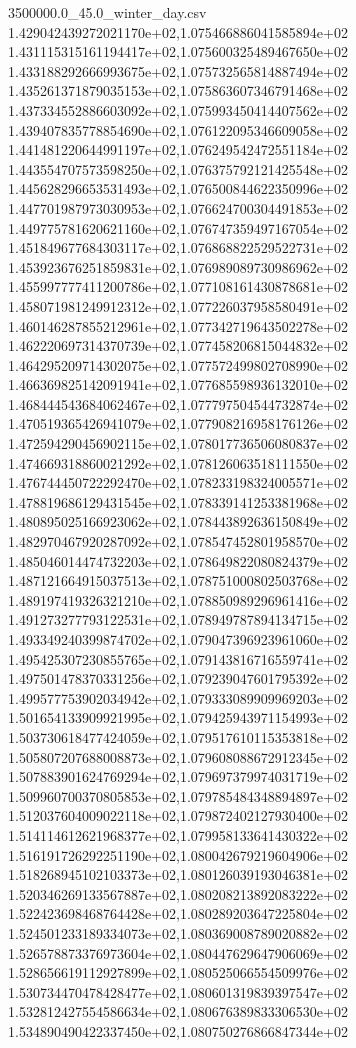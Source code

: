 \begin{filecontents*}{3500000.0_45.0_winter_day.csv}
1.429042439272021170e+02,1.075466886041585894e+02
1.431115315161194417e+02,1.075600325489467650e+02
1.433188292666993675e+02,1.075732565814887494e+02
1.435261371879035153e+02,1.075863607346791468e+02
1.437334552886603092e+02,1.075993450414407562e+02
1.439407835778854690e+02,1.076122095346609058e+02
1.441481220644991197e+02,1.076249542472551184e+02
1.443554707573598250e+02,1.076375792121425548e+02
1.445628296653531493e+02,1.076500844622350996e+02
1.447701987973030953e+02,1.076624700304491853e+02
1.449775781620621160e+02,1.076747359497167054e+02
1.451849677684303117e+02,1.076868822529522731e+02
1.453923676251859831e+02,1.076989089730986962e+02
1.455997777411200786e+02,1.077108161430878681e+02
1.458071981249912312e+02,1.077226037958580491e+02
1.460146287855212961e+02,1.077342719643502278e+02
1.462220697314370739e+02,1.077458206815044832e+02
1.464295209714302075e+02,1.077572499802708990e+02
1.466369825142091941e+02,1.077685598936132010e+02
1.468444543684062467e+02,1.077797504544732874e+02
1.470519365426941079e+02,1.077908216958176126e+02
1.472594290456902115e+02,1.078017736506080837e+02
1.474669318860021292e+02,1.078126063518111550e+02
1.476744450722292470e+02,1.078233198324005571e+02
1.478819686129431545e+02,1.078339141253381968e+02
1.480895025166923062e+02,1.078443892636150849e+02
1.482970467920287092e+02,1.078547452801958570e+02
1.485046014474732203e+02,1.078649822080824379e+02
1.487121664915037513e+02,1.078751000802503768e+02
1.489197419326321210e+02,1.078850989296961416e+02
1.491273277793122531e+02,1.078949787894134715e+02
1.493349240399874702e+02,1.079047396923961060e+02
1.495425307230855765e+02,1.079143816716559741e+02
1.497501478370331256e+02,1.079239047601795392e+02
1.499577753902034942e+02,1.079333089909969203e+02
1.501654133909921995e+02,1.079425943971154993e+02
1.503730618477424059e+02,1.079517610115353818e+02
1.505807207688008873e+02,1.079608088672912345e+02
1.507883901624769294e+02,1.079697379974031719e+02
1.509960700370805853e+02,1.079785484348894897e+02
1.512037604009022118e+02,1.079872402127930400e+02
1.514114612621968377e+02,1.079958133641430322e+02
1.516191726292251190e+02,1.080042679219604906e+02
1.518268945102103373e+02,1.080126039193046381e+02
1.520346269133567887e+02,1.080208213892083222e+02
1.522423698468764428e+02,1.080289203647225804e+02
1.524501233189334073e+02,1.080369008789020882e+02
1.526578873376973604e+02,1.080447629647906069e+02
1.528656619112927899e+02,1.080525066554509976e+02
1.530734470478428477e+02,1.080601319839397547e+02
1.532812427554586634e+02,1.080676389833306530e+02
1.534890490422337450e+02,1.080750276866847344e+02

\end{filecontents*}
